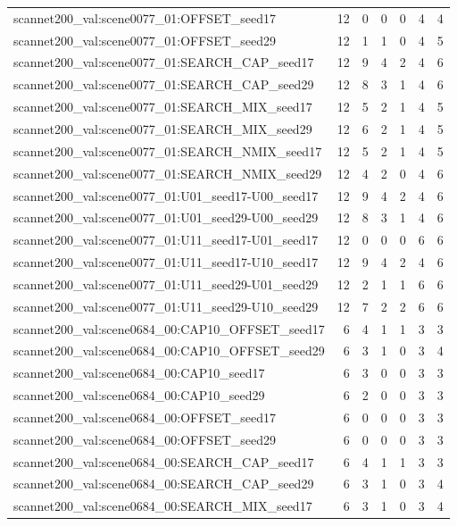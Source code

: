 \begin{table}[t]
\begin{tabular}{lrrrrrr}
scannet200\_val:scene0077\_01:OFFSET\_seed17 & 12 & 0 & 0 & 0 & 4 & 4 \\
scannet200\_val:scene0077\_01:OFFSET\_seed29 & 12 & 1 & 1 & 0 & 4 & 5 \\
scannet200\_val:scene0077\_01:SEARCH\_CAP\_seed17 & 12 & 9 & 4 & 2 & 4 & 6 \\
scannet200\_val:scene0077\_01:SEARCH\_CAP\_seed29 & 12 & 8 & 3 & 1 & 4 & 6 \\
scannet200\_val:scene0077\_01:SEARCH\_MIX\_seed17 & 12 & 5 & 2 & 1 & 4 & 5 \\
scannet200\_val:scene0077\_01:SEARCH\_MIX\_seed29 & 12 & 6 & 2 & 1 & 4 & 5 \\
scannet200\_val:scene0077\_01:SEARCH\_NMIX\_seed17 & 12 & 5 & 2 & 1 & 4 & 5 \\
scannet200\_val:scene0077\_01:SEARCH\_NMIX\_seed29 & 12 & 4 & 2 & 0 & 4 & 6 \\
scannet200\_val:scene0077\_01:U01\_seed17-U00\_seed17 & 12 & 9 & 4 & 2 & 4 & 6 \\
scannet200\_val:scene0077\_01:U01\_seed29-U00\_seed29 & 12 & 8 & 3 & 1 & 4 & 6 \\
scannet200\_val:scene0077\_01:U11\_seed17-U01\_seed17 & 12 & 0 & 0 & 0 & 6 & 6 \\
scannet200\_val:scene0077\_01:U11\_seed17-U10\_seed17 & 12 & 9 & 4 & 2 & 4 & 6 \\
scannet200\_val:scene0077\_01:U11\_seed29-U01\_seed29 & 12 & 2 & 1 & 1 & 6 & 6 \\
scannet200\_val:scene0077\_01:U11\_seed29-U10\_seed29 & 12 & 7 & 2 & 2 & 6 & 6 \\
scannet200\_val:scene0684\_00:CAP10\_OFFSET\_seed17 & 6 & 4 & 1 & 1 & 3 & 3 \\
scannet200\_val:scene0684\_00:CAP10\_OFFSET\_seed29 & 6 & 3 & 1 & 0 & 3 & 4 \\
scannet200\_val:scene0684\_00:CAP10\_seed17 & 6 & 3 & 0 & 0 & 3 & 3 \\
scannet200\_val:scene0684\_00:CAP10\_seed29 & 6 & 2 & 0 & 0 & 3 & 3 \\
scannet200\_val:scene0684\_00:OFFSET\_seed17 & 6 & 0 & 0 & 0 & 3 & 3 \\
scannet200\_val:scene0684\_00:OFFSET\_seed29 & 6 & 0 & 0 & 0 & 3 & 3 \\
scannet200\_val:scene0684\_00:SEARCH\_CAP\_seed17 & 6 & 4 & 1 & 1 & 3 & 3 \\
scannet200\_val:scene0684\_00:SEARCH\_CAP\_seed29 & 6 & 3 & 1 & 0 & 3 & 4 \\
scannet200\_val:scene0684\_00:SEARCH\_MIX\_seed17 & 6 & 3 & 1 & 0 & 3 & 4 \\

\end{tabular}
\end{table}

